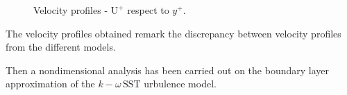 \documentclass[a4paper,12pt]{article}
\newcommand{\komegasst}[1]{$k\!-\!\omega \, \text{SST} $ }
\begin{document}
\begin{figure}[H]
\centering
{}
\caption{Velocity profiles - $\text{U}^+$ respect to $y^+$.}
\end{figure}


The velocity profiles obtained remark the discrepancy between velocity profiles from the different models.

Then a nondimensional analysis has been carried out on the boundary layer approximation of the \komegasst turbulence model.

\end{document}
